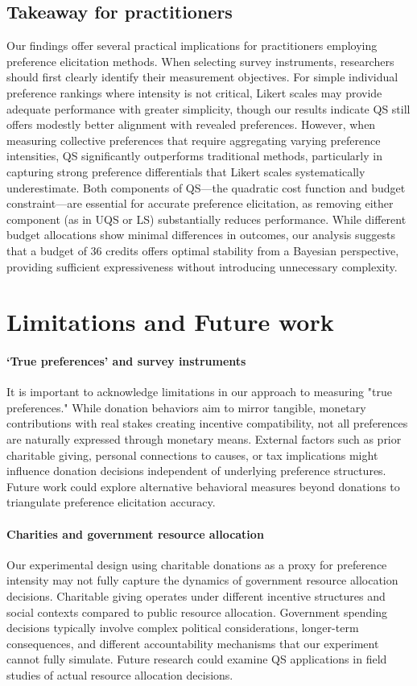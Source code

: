 \subsection{Takeaway for practitioners}
Our findings offer several practical implications for practitioners employing preference elicitation methods. When selecting survey instruments, researchers should first clearly identify their measurement objectives. For simple individual preference rankings where intensity is not critical, Likert scales may provide adequate performance with greater simplicity, though our results indicate QS still offers modestly better alignment with revealed preferences. However, when measuring collective preferences that require aggregating varying preference intensities, QS significantly outperforms traditional methods, particularly in capturing strong preference differentials that Likert scales systematically underestimate. Both components of QS—the quadratic cost function and budget constraint—are essential for accurate preference elicitation, as removing either component (as in UQS or LS) substantially reduces performance. While different budget allocations show minimal differences in outcomes, our analysis suggests that a budget of 36 credits offers optimal stability from a Bayesian perspective, providing sufficient expressiveness without introducing unnecessary complexity.

\section{Limitations and Future work}
\label{sec:limitations}

\paragraph{`True preferences' and survey instruments}
It is important to acknowledge limitations in our approach to measuring "true preferences." While donation behaviors aim to mirror tangible, monetary contributions with real stakes creating incentive compatibility, not all preferences are naturally expressed through monetary means. External factors such as prior charitable giving, personal connections to causes, or tax implications might influence donation decisions independent of underlying preference structures. Future work could explore alternative behavioral measures beyond donations to triangulate preference elicitation accuracy.

\paragraph{Charities and government resource allocation}
Our experimental design using charitable donations as a proxy for preference intensity may not fully capture the dynamics of government resource allocation decisions. Charitable giving operates under different incentive structures and social contexts compared to public resource allocation. Government spending decisions typically involve complex political considerations, longer-term consequences, and different accountability mechanisms that our experiment cannot fully simulate. Future research could examine QS applications in field studies of actual resource allocation decisions.

